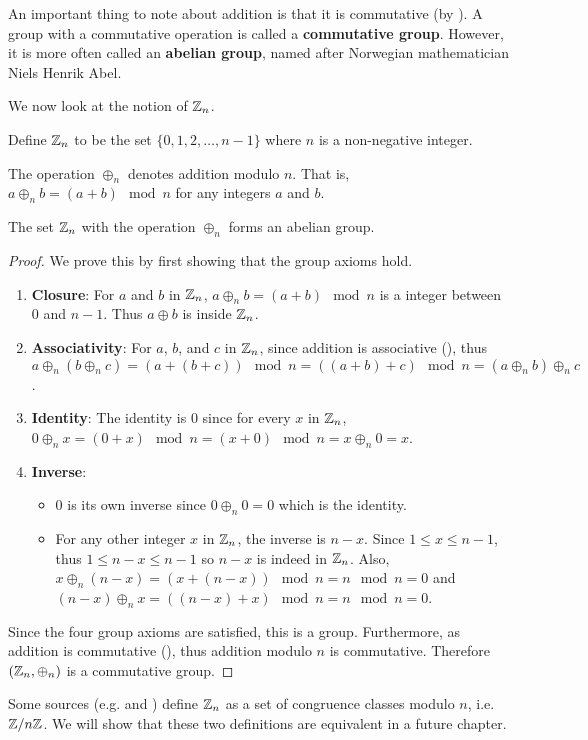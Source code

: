 An important thing to note about addition is that it is commutative (by ). A group with a commutative operation is called a \textbf{commutative group}. However, it is more often called an \textbf{abelian group}, named after Norwegian mathematician Niels Henrik Abel.

We now look at the notion of $\mathbb{Z}_n$.
\begin{definition}
    Define $\mathbb{Z}_n$ to be the set $\{0, 1, 2, \dots, n-1\}$ where $n$ is a non-negative integer.
\end{definition}
\begin{definition}
    The operation $\oplus_n$ denotes addition modulo $n$. That is, $a \oplus_n b = (a + b) \mod{n}$ for any integers $a$ and $b$.
\end{definition}
\begin{proposition}\label{prop-Zn-is-abelian-group}
    The set $\mathbb{Z}_n$ with the operation $\oplus_n$ forms an abelian group.
\end{proposition}
\begin{proof}
    We prove this by first showing that the group axioms hold.
    \begin{enumerate}
        \item \textbf{Closure}: For $a$ and $b$ in $\mathbb{Z}_n$, $a \oplus_n b = (a + b) \mod{n}$ is a integer between 0 and $n - 1$. Thus $a \oplus b$ is inside $\mathbb{Z}_n$.
        \item \textbf{Associativity}: For $a$, $b$, and $c$ in $\mathbb{Z}_n$, since addition is associative (), thus $a \oplus_n (b \oplus_n c) = (a + (b + c)) \mod{n} = ((a + b) + c) \mod{n} = (a \oplus_n b) \oplus_n c$.
        \item \textbf{Identity}: The identity is $0$ since for every $x$ in $\mathbb{Z}_n$, $0 \oplus_n x = (0 + x) \mod{n} = (x + 0) \mod{n} = x \oplus_n 0 = x$.
        \item \textbf{Inverse}:
        \begin{itemize}
            \item $0$ is its own inverse since $0 \oplus_n 0 = 0$ which is the identity.
            \item For any other integer $x$ in $\mathbb{Z}_n$, the inverse is $n - x$. Since $1 \leq x \leq n - 1$, thus $1 \leq n - x \leq n - 1$ so $n - x$ is indeed in $\mathbb{Z}_n$. Also, $x \oplus_n (n - x) = (x + (n - x)) \mod{n} = n \mod{n} = 0$ and $(n - x) \oplus_n x = ((n-x) + x)\mod{n} = n \mod{n} = 0$.
        \end{itemize}
    \end{enumerate}
    Since the four group axioms are satisfied, this is a group. Furthermore, as addition is commutative (), thus addition modulo $n$ is commutative. Therefore $(\mathbb{Z}_n, \oplus_n)$ is a commutative group.
\end{proof}
\begin{remark}
    Some sources (e.g. {\cite[\S 33]{clark_1984}} and {\cite[Proposition 2.31]{humphreys_1996}}) define $\mathbb{Z}_n$ as a set of congruence classes modulo $n$, i.e. $\mathbb{Z}/n\mathbb{Z}$. We will show that these two definitions are equivalent in a future chapter.
\end{remark}

